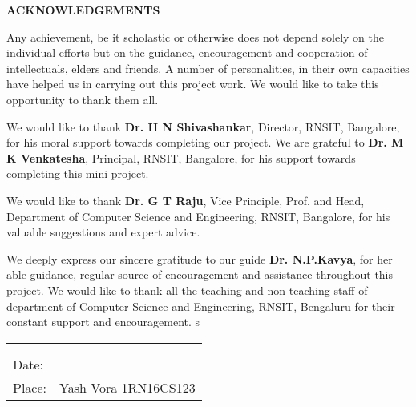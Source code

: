 \thispagestyle{empty}
\begin{center}
\textup{\large{\textbf{ACKNOWLEDGEMENTS}}} \\[0.1in]
\end{center}

\justify
\indent
Any achievement, be it scholastic or otherwise does not depend solely on the individual efforts but on the guidance, encouragement and cooperation of intellectuals, elders and friends. A number of personalities, in their own capacities have helped us in carrying out this project work. We would like to take this opportunity to thank them all.

We would like to thank \textbf{Dr. H N Shivashankar}, Director, RNSIT, Bangalore, for his moral support towards completing our project. We are grateful to \textbf{Dr. M K Venkatesha}, Principal, RNSIT, Bangalore, for his support towards completing this mini project.

We would like to thank \textbf{Dr. G T Raju}, Vice Principle, Prof. and Head, Department of
Computer Science and Engineering, RNSIT, Bangalore, for his valuable suggestions and expert advice.

We deeply express our sincere gratitude to our guide \textbf{Dr. N.P.Kavya}, for her able guidance, regular source of encouragement and assistance throughout this project.
We would like to thank all the teaching and non-teaching staff of department of Computer Science and Engineering, RNSIT, Bengaluru for their constant support and encouragement. s

\vfill

\justify
\begin{tabularx}{\linewidth}{X X}
 & {\hfill}\textup{ }\\ 
  & {\hfill}\textup{ }\\ 
 \textup{Date:} & {\hfill}\textup{ }\\
\textup{Place:} & {\hfill}\textup{Yash Vora 1RN16CS123}\\
\end{tabularx}


\pagebreak